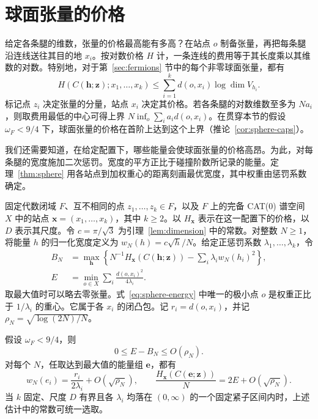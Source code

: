 \section{球面张量的价格}\label{sec:sphere}

给定各条腿的维数，张量的价格最高能有多高？在站点 \(o\) 制备张量，再把每条腿沿连线送往其目的地 \(x_i\)。按对数价格 \(H\) 计，一条连线的费用等于其长度乘以其维数的对数。特别地，对于第~\ref{sec:fermions} 节中的每个非零球面张量，都有
\begin{equation}\label{eq:sphere-transport}
 H(C(\mathbf h;\mathbf z);x_1,\ldots,x_k)
 \le \sum_{i=1}^k d(o,x_i)\log\dim V_{h_i}.
\end{equation}
标记点 \(z_i\) 决定张量的分量，站点 \(x_i\) 决定其价格。若各条腿的对数维数至多为 \(Na_i\)，则取费用最低的中心可得上界 \(N\inf_o\sum_i a_i d(o,x_i)\)。在贯穿本节的假设 \(\omega_F<9/4\) 下，球面张量的价格在首阶上达到这个上界（推论~\ref{cor:sphere-caps}）。

我们还需要知道，在给定配置下，哪些能量会使球面张量的价格高昂。为此，对每条腿的宽度施加二次惩罚。宽度的平方正比于碰撞阶数所记录的能量。定理~\ref{thm:sphere} 用各站点到加权重心的距离刻画最优宽度，其中权重由惩罚系数确定。

固定代数闭域 \(F\)、互不相同的点 \(z_1,\ldots,z_k\in F\)，以及 \(F\) 上的完备 CAT(0) 谱空间 \(X\) 中的站点 \(\mathbf x=(x_1,\ldots,x_k)\)，其中 \(k\ge2\)。以 \(H_{\mathbf x}\) 表示在这一配置下的价格，以 \(D\) 表示其尺度。令 \(c=\pi/\sqrt3\) 为引理~\ref{lem:dimension} 中的常数。对整数 \(N\ge1\)，将能量 \(h\) 的归一化宽度定义为 \(w_N(h)=c\sqrt h/N\)。给定正惩罚系数 \(\lambda_1,\ldots,\lambda_k\)，令
\begin{align}
 B_N&=\max_{\mathbf h}
 \left\{N^{-1}H_{\mathbf x}(C(\mathbf h;\mathbf z))-
                      \sum_i\lambda_iw_N(h_i)^2\right\},
 \label{eq:sphere-objective}\\
 E&=\min_{o\in X}\sum_i\frac{d(o,x_i)^2}{4\lambda_i}.
 \label{eq:sphere-energy}
\end{align}
取最大值时可以略去零张量。式~\eqref{eq:sphere-energy} 中唯一的极小点 \(o\) 是权重正比于 \(1/\lambda_i\) 的重心。它属于各 \(x_i\) 的闭凸包。记 \(r_i=d(o,x_i)\)，并记 \(\rho_N=\sqrt{\log(2N)/N}\)。

\begin{theorem}[球面张量的价格]\label{thm:sphere}
假设 \(\omega_F<9/4\)，则
\begin{equation}\label{eq:sphere-estimate}
       0\le E-B_N\le O(\rho_N).
\end{equation}
对每个 \(N\)，任取达到最大值的能量组 \(\mathbf e\)，都有
\begin{equation}\label{eq:sphere-profile}
 w_N(e_i)=\frac{r_i}{2\lambda_i}+O(\sqrt{\rho_N}),
 \qquad
 \frac{H_{\mathbf x}(C(\mathbf e;\mathbf z))}{N}=2E+O(\sqrt{\rho_N}).
\end{equation}
当 \(k\) 固定、尺度 \(D\) 有界且各 \(\lambda_i\) 均落在 \((0,\infty)\) 的一个固定紧子区间内时，上述估计中的常数可统一选取。
\end{theorem}


